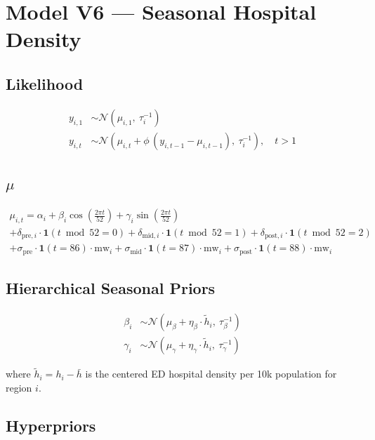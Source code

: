 \documentclass{article}
\begin{document}
\section*{Model V6 --- Seasonal Hospital Density}

\subsection*{Likelihood}

\begin{align}
  y_{i,1} &\sim \mathcal{N}(\mu_{i,1},\ \tau_i^{-1}) \\[6pt]
  y_{i,t} &\sim \mathcal{N}\left(\mu_{i,t} + \phi\,(y_{i,t-1} - \mu_{i,t-1}),\ \tau_i^{-1}\right), \quad t > 1
\end{align}

\subsection*{$\mu$}

\begin{multline}
  \mu_{i,t} = \alpha_i
    + \beta_i \cos\left(\tfrac{2\pi t}{52}\right)
    + \gamma_i \sin\left(\tfrac{2\pi t}{52}\right) \\
    + \delta_{\text{pre},i} \cdot \mathbf{1}(t \bmod 52 = 0)
    + \delta_{\text{mid},i} \cdot \mathbf{1}(t \bmod 52 = 1)
    + \delta_{\text{post},i} \cdot \mathbf{1}(t \bmod 52 = 2) \\
    + \sigma_{\text{pre}} \cdot \mathbf{1}(t = 86) \cdot \mathrm{mw}_i
    + \sigma_{\text{mid}} \cdot \mathbf{1}(t = 87) \cdot \mathrm{mw}_i
    + \sigma_{\text{post}} \cdot \mathbf{1}(t = 88) \cdot \mathrm{mw}_i
\end{multline}

\subsection*{Hierarchical Seasonal Priors}

\begin{align}
  \beta_i  &\sim \mathcal{N}(\mu_\beta + \eta_\beta \cdot \tilde{h}_i,\ \tau_\beta^{-1}) \\
  \gamma_i &\sim \mathcal{N}(\mu_\gamma + \eta_\gamma \cdot \tilde{h}_i,\ \tau_\gamma^{-1})
\end{align}

where $\tilde{h}_i = h_i - \bar{h}$ is the centered ED hospital density per 10k population for region $i$.

\subsection*{Hyperpriors}
\end{document}
